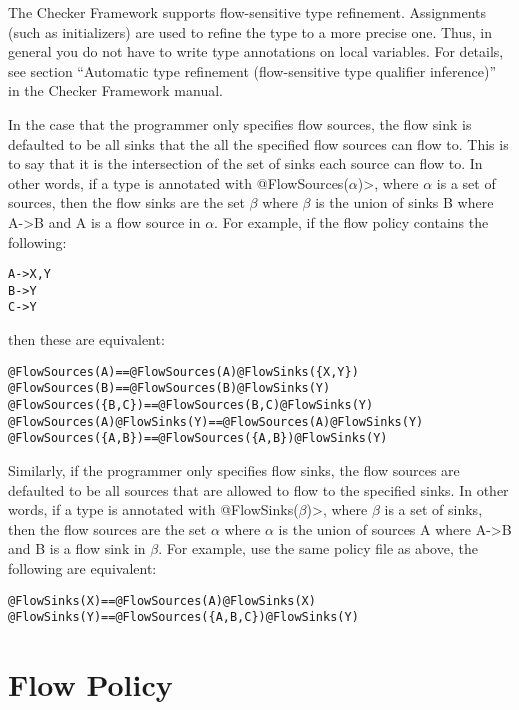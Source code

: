 The Checker Framework supports flow-sensitive type refinement.  Assignments (such as
initializers) are used to refine the type to a more precise one.  Thus, in
general you do not have to write type annotations on local variables.  For
details, see section ``Automatic type refinement (flow-sensitive type
qualifier inference)'' in the Checker Framework manual.

In the case that the programmer only specifies flow sources, the flow sink is defaulted to be all 
sinks that the all the specified flow sources can flow to. This is to say that 
it is the intersection of the set of sinks each source can flow to.
 In other words, if a type is annotated with 
\<@FlowSources($\alpha$)>, where $\alpha$ is a set of sources, then the flow sinks are the set 
$\beta$ where $\beta$ is the union of sinks B where A-\textgreater B and A is a flow source in 
$\alpha$.  For example, if the flow policy contains the following:

\begin{alltt}
  A->X,Y
  B->Y
  C->Y
\end{alltt}
  
\noindent 
then these are equivalent:

\begin{alltt}
  @FlowSources(A)                 ==   @FlowSources(A) @FlowSinks(\{X, Y\})
  @FlowSources(B)                 ==   @FlowSources(B) @FlowSinks(Y)
  @FlowSources(\{B,C\})             ==   @FlowSources(B,C) @FlowSinks(Y)
  @FlowSources(A) @FlowSinks(Y)   ==   @FlowSources(A) @FlowSinks(Y) 
  @FlowSources(\{A,B\})             ==   @FlowSources(\{A,B\}) @FlowSinks(Y)
\end{alltt}


Similarly, if the programmer only specifies flow sinks, the flow sources are defaulted to be all sources 
that are allowed to flow to  the specified sinks.  In other words, if a type is annotated with 
\<@FlowSinks($\beta$)>, where $\beta$ is a set of sinks, then the flow sources are the set 
$\alpha$ where $\alpha$ is the union of sources A where A-\textgreater B and B is a flow sink in 
$\beta$. For example, use the same policy file as above, the following are equivalent:

\begin{alltt}
  @FlowSinks(X)                   ==   @FlowSources(A) @FlowSinks(X)
  @FlowSinks(Y)                   ==   @FlowSources(\{A,B,C\}) @FlowSinks(Y)
\end{alltt}

\section{Flow Policy}
\label{sec:flowpolicy}

